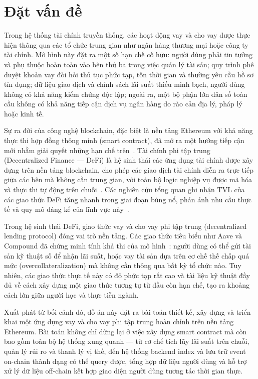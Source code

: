 \documentclass[../DoAn.tex]{subfiles}
\begin{document}
\section{Đặt vấn đề}
\label{section:1.1}

Trong hệ thống tài chính truyền thống, các hoạt động vay và cho vay được thực hiện thông qua các tổ chức trung gian như ngân hàng thương mại hoặc công ty tài chính. Mô hình này đặt ra một số hạn chế cố hữu: người dùng phải tin tưởng và phụ thuộc hoàn toàn vào bên thứ ba trong việc quản lý tài sản; quy trình phê duyệt khoản vay đòi hỏi thủ tục phức tạp, tốn thời gian và thường yêu cầu hồ sơ tín dụng; dữ liệu giao dịch và chính sách lãi suất thiếu minh bạch, người dùng không có khả năng kiểm chứng độc lập; ngoài ra, một bộ phận lớn dân số toàn cầu không có khả năng tiếp cận dịch vụ ngân hàng do rào cản địa lý, pháp lý hoặc kinh tế.

Sự ra đời của công nghệ blockchain, đặc biệt là nền tảng Ethereum với khả năng thực thi hợp đồng thông minh (smart contract), đã mở ra một hướng tiếp cận mới nhằm giải quyết những hạn chế trên~\cite{EthereumWhitepaper,EthereumDocs}. Tài chính phi tập trung (Decentralized Finance --- DeFi) là hệ sinh thái các ứng dụng tài chính được xây dựng trên nền tảng blockchain, cho phép các giao dịch tài chính diễn ra trực tiếp giữa các bên mà không cần trung gian, với toàn bộ logic nghiệp vụ được mã hóa và thực thi tự động trên chuỗi~\cite{Gudgeon2020DeFi}. Các nghiên cứu tổng quan ghi nhận TVL của các giao thức DeFi tăng nhanh trong giai đoạn bùng nổ, phản ánh nhu cầu thực tế và quy mô đáng kể của lĩnh vực này~\cite{Gudgeon2020DeFi}.

Trong hệ sinh thái DeFi, giao thức vay và cho vay phi tập trung (decentralized lending protocol) đóng vai trò nền tảng. Các giao thức tiêu biểu như Aave và Compound đã chứng minh tính khả thi của mô hình~\cite{AaveV2Whitepaper,CompoundV2Docs,CompoundWhitepaper}: người dùng có thể gửi tài sản kỹ thuật số để nhận lãi suất, hoặc vay tài sản dựa trên cơ chế thế chấp quá mức (overcollateralization) mà không cần thông qua bất kỳ tổ chức nào. Tuy nhiên, các giao thức thực tế này có độ phức tạp rất cao và tài liệu kỹ thuật đầy đủ về cách xây dựng một giao thức tương tự từ đầu còn hạn chế, tạo ra khoảng cách lớn giữa người học và thực tiễn ngành.

Xuất phát từ bối cảnh đó, đồ án này đặt ra bài toán thiết kế, xây dựng và triển khai một ứng dụng vay và cho vay phi tập trung hoàn chỉnh trên nền tảng Ethereum. Bài toán không chỉ dừng lại ở việc xây dựng smart contract mà còn bao gồm toàn bộ hệ thống xung quanh --- từ cơ chế tích lũy lãi suất trên chuỗi, quản lý rủi ro và thanh lý vị thế, đến hệ thống backend index và lưu trữ event on-chain thành dạng có thể query được, tổng hợp dữ liệu người dùng và hỗ trợ xử lý dữ liệu off-chain kết hợp giao diện người dùng tương tác thời gian thực.
\end{document}
